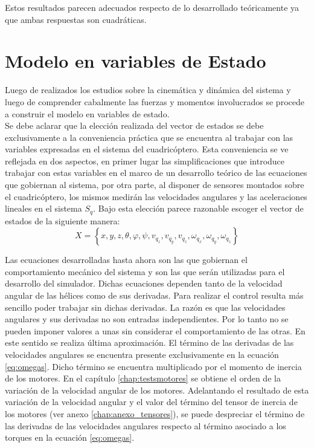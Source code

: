 \documentclass[main]{subfiles}
\begin{document}
Estos resultados parecen adecuados respecto de lo desarrollado te\'oricamente ya que ambas respuestas son cuadr\'aticas. 

\section{Modelo en variables de Estado}

Luego de realizados los estudios sobre la cinem\'atica y din\'amica del sistema y luego de comprender cabalmente las fuerzas y momentos involucrados se procede a construir el modelo en variables de estado.\\ 

Se debe aclarar que la elecci\'on realizada del vector de estados se debe exclusivamente a la conveniencia pr\'actica que se encuentra al trabajar con las variables expresadas en el sistema del cuadric\'optero. Esta conveniencia se ve reflejada en dos aspectos, en primer lugar las simplificaciones que introduce trabajar con estas variables en el marco de un desarrollo te\'orico de las ecuaciones que gobiernan al sistema, por otra parte, al disponer de sensores montados sobre el cuadric\'optero, los mismos medir\'an las velocidades angulares y las aceleraciones lineales en el sistema $S_q$. Bajo esta elecci\'on parece razonable escoger el vector de estados de la siguiente manera:
\begin{equation}
X=\left\lbrace  x,y,z, \theta,\varphi,\psi, v_{q_z},v_{q_y},v_{q_z},\omega_{q_x},\omega_{q_y},\omega_{q_z} \right\rbrace
\end{equation}

Las ecuaciones desarrolladas hasta ahora son las que gobiernan el comportamiento mecánico del sistema y son las que serán utilizadas para el desarrollo del simulador. Dichas ecuaciones dependen tanto de la velocidad angular de las hélices como de sus derivadas. Para realizar el control resulta m\'as sencillo poder trabajar sin dichas derivadas. La raz\'on es que las velocidades angulares y sus derivadas no son entradas independientes. Por lo tanto no se pueden imponer valores a unas sin considerar el comportamiento de las otras. En este sentido se realiza \'ultima aproximaci\'on. El t\'ermino de las derivadas de las velocidades angulares se encuentra presente exclusivamente en la ecuaci\'on \ref{eq:omegas}. Dicho t\'ermino se encuentra multiplicado por el momento de inercia de los motores. En el cap\'itulo \ref{chap:testsmotores} se obtiene el orden de la variaci\'on de la velocidad angular de los motores. Adelantando el resultado de esta variaci\'on de la velocidad angular y el valor del t\'ermino del tensor de inercia de los motores (ver anexo \ref{chap:anexo_tensores}), se puede despreciar el t\'ermino de las derivadas de las velocidades angulares respecto al t\'ermino asociado a los torques en la ecuaci\'on \ref{eq:omegas}.\\
\end{document}
